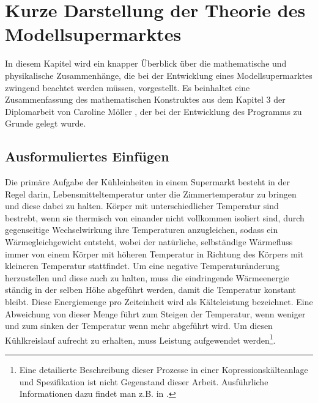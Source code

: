 \chapter{Kurze Darstellung der Theorie des Modellsupermarktes}
\label{chap:theorie}
\minitoc
In diesem Kapitel wird ein knapper Überblick über die mathematische und physikalische Zusammenhänge, die bei der Entwicklung eines
Modellsupermarktes zwingend beachtet werden müssen, vorgestellt. Es beinhaltet eine
Zusammenfassung des mathematischen Konstruktes aus dem Kapitel 3 der Diplomarbeit von Caroline Möller \cite{caro}, der bei der
Entwicklung des Programms zu Grunde gelegt wurde.

\section{Ausformuliertes Einfügen}

Die primäre Aufgabe der Kühleinheiten in einem Supermarkt besteht in der Regel darin, Lebensmitteltemperatur unter die
Zimmertemperatur zu bringen und diese dabei zu halten. Körper mit unterschiedlicher Temperatur
sind bestrebt, wenn sie thermisch von einander nicht vollkommen isoliert sind, durch gegenseitige Wechselwirkung ihre
Temperaturen anzugleichen, sodass ein Wärmegleichgewicht entsteht, wobei der natürliche, selbständige Wärmefluss immer von
einem Körper mit höheren Temperatur in Richtung des Körpers mit kleineren Temperatur stattfindet. Um eine negative
Temperaturänderung herzustellen und diese auch zu halten, muss die eindringende Wärmeenergie ständig in der selben Höhe
abgeführt werden, damit die Temperatur konstant bleibt. Diese Energiemenge pro Zeiteinheit wird als Kälteleistung bezeichnet.
Eine Abweichung von dieser Menge führt zum Steigen der Temperatur, wenn weniger und zum sinken der Temperatur wenn mehr
abgeführt wird. Um diesen Kühlkreislauf aufrecht zu erhalten, muss Leistung aufgewendet werden\footnote{ Eine detailierte
Beschreibung dieser Prozesse in einer Kopressionskälteanlage und Spezifikation ist nicht Gegenstand dieser Arbeit.
Ausführliche Informationen dazu findet man z.B.  in \cite{caro, doctor, TAB_A1}.}.


%

